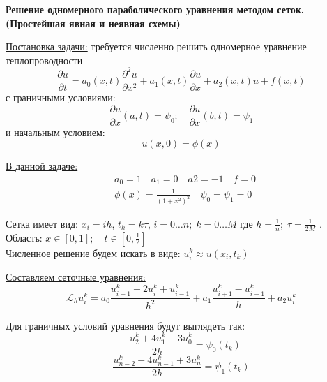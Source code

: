 \documentclass[a4paper,12pt]{report}
\begin{document}
\begin{center}
\Large
{\bf Решение одномерного параболического уравнения методом сеток. (Простейшая явная и неявная схемы)}
\end{center}

\underline{Постановка задачи:} требуется численно решить одномерное уравнение теплопроводности
\begin{equation}
\frac{\partial u}{\partial t} = a_{0}(x,t)\frac{\partial^2 u}{\partial x^2} + a_1(x,t)\frac{\partial u}{\partial x} + a_2(x,t)u + f(x,t)
\end{equation}
с граничными условиями:
\begin{equation}
\frac{\partial u}{\partial x}(a,t) = \psi_0 ; \quad
\frac{\partial u}{\partial x}(b,t) = \psi_1
\end{equation}
и начальным условием: 
\begin{equation}
u(x,0) = \phi(x)
\end{equation}

\underline{В данной задаче:}
\begin{equation}
\begin{aligned}
&a_{0} = 1 \quad a_1  = 0 \quad a2  = -1 \quad f = 0 \\
&\phi(x) = \frac{1}{(1+x^2)^2} \quad \psi_0 = \psi_1 = 0
\end{aligned}
\end{equation}

Сетка имеет вид: $x_i = ih$, $t_k = k\tau$, $i=0 \dots n; \; k=0 \dots M$ где $h=\frac{1}{n}; \; \tau = \frac{1}{2M}$ . 
\\Область: $x\in[0,1]; \quad t\in[0,\frac{1}{2}]$
\\Численное решение будем искать в виде: $u_i^k \approx u(x_i, t_k)$

\underline{Составляем сеточные уравнения:} 
\begin{equation}
\mathcal{L}_h u_i^k = a_{0}\frac{u_{i+1}^k-2u_i^k+u_{i-1}^k}{h^2} + a_1\frac{u_{i+1}^k-u_{i-1}^k}{h} + a_2 u_i^k
\end{equation}

Для граничных условий уравнения будут выглядеть так:
\begin{equation}
\frac{-u_2^k + 4u_1^k - 3u_0^k}{2h} = \psi_0(t_k)
\end{equation}
\begin{equation}
\frac{u_{n-2}^k - 4u_{n-1}^k + 3u_n^k}{2h} = \psi_1(t_k)
\end{equation}
\end{document}
